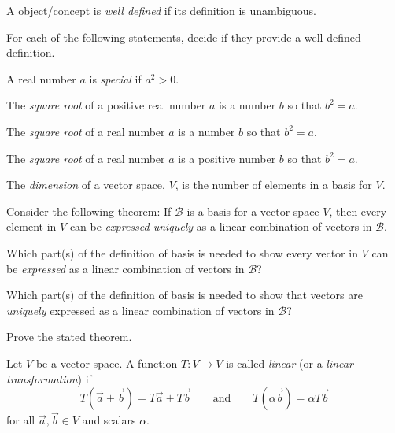 \documentclass[14pt]{problemset}
\begin{document}
	\begin{definition}
		A object/concept is \emph{well defined} if its definition is unambiguous.
	\end{definition}

	\question
	For each of the following statements, decide if they provide a well-defined definition.
	\begin{parts}
		\item A real number $a$ is \emph{special} if $a^2>0$.
		\item The \emph{square root} of a positive real number $a$ is a number $b$ so
			that $b^2=a$.
		\item The \emph{square root} of a real number $a$ is a number $b$ so
			that $b^2=a$.
		\item The \emph{square root} of a real number $a$ is a positive number $b$ so
			that $b^2=a$.
		\item The \emph{dimension} of a vector space, $V$, is the number of elements in a basis
			for $V$.
	\end{parts}

	\question
	Consider the following theorem: If $\mathcal B$ is a basis for a vector space $V$, then every
	element in $V$ can be \emph{expressed uniquely} as a linear combination of vectors in $\mathcal B$.
	\begin{parts}
		\item Which part(s) of the definition of basis is needed to show every vector in $V$ can be
			\emph{expressed} as a linear combination of vectors in $\mathcal B$?
		\item Which part(s) of the definition of basis is needed to show that vectors 
			are \emph{uniquely} expressed as a linear 
			combination of vectors in $\mathcal B$?
		\item Prove the stated theorem.
	\end{parts}

	\newpage
	\begin{definition}
		Let $V$ be a vector space. A function $T:V\to V$ is called
		\emph{linear} (or a \emph{linear transformation}) if
		\[
			T(\vec a+\vec b)=T\vec a+T\vec b\qquad\text{and}\qquad
			T(\alpha\vec b)=\alpha T\vec b
		\]
		for all $\vec a,\vec b\in V$ and scalars $\alpha$.
	\end{definition}
\end{document}
